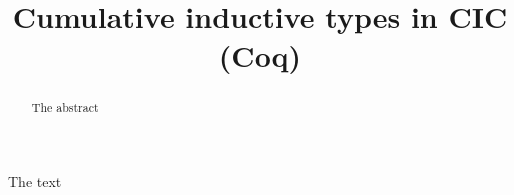 \documentclass{easychair}
\title{Cumulative inductive types in CIC (Coq)}
\author{
}
\institute{
 }
\begin{document}
\maketitle

\begin{abstract}
The abstract
\end{abstract}

The text
\end{document}
